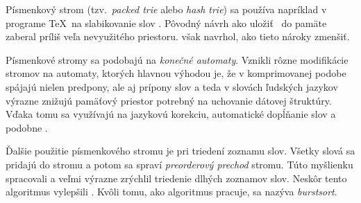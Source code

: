 Písmenkový strom (tzv.\ \emph{packed trie} alebo \emph{hash trie}) sa používa
napríklad v programe \TeX\ na slabikovanie slov \citep{liang}.
Pôvodný návrh \citep{fredkin} ako uložiť \trie\ do pamäte zaberal
príliš veľa nevyužitého priestoru. \citet{liang} však navrhol, ako
tieto nároky zmenšiť.

Písmenkové stromy sa podobajú na \emph{konečné automaty}. 
Vznikli rôzne modifikácie stromov na automaty, ktorých hlavnou výhodou je, 
že v komprimovanej podobe spájajú nielen predpony, ale aj prípony slov 
a teda v slovách ľudských jazykov výrazne znižujú pamäťový priestor potrebný 
na uchovanie dátovej štruktúry. Vďaka tomu sa využívajú na jazykovú korekciu, 
automatické dopĺňanie slov a podobne \citep{scrabble,ca}. 

Ďalšie použitie písmenkového stromu je pri triedení zoznamu slov. 
Všetky slová sa pridajú do stromu a potom sa spraví \emph{preorderový prechod} 
stromu. Túto myšlienku spracovali \citet{burstsort1} a veľmi výrazne zrýchlil 
triedenie dlhých zoznamov slov. Neskôr tento algoritmus vylepšili 
\citet{burstsort2}. Kvôli tomu, ako algoritmus pracuje, 
sa nazýva \emph{burstsort}.



